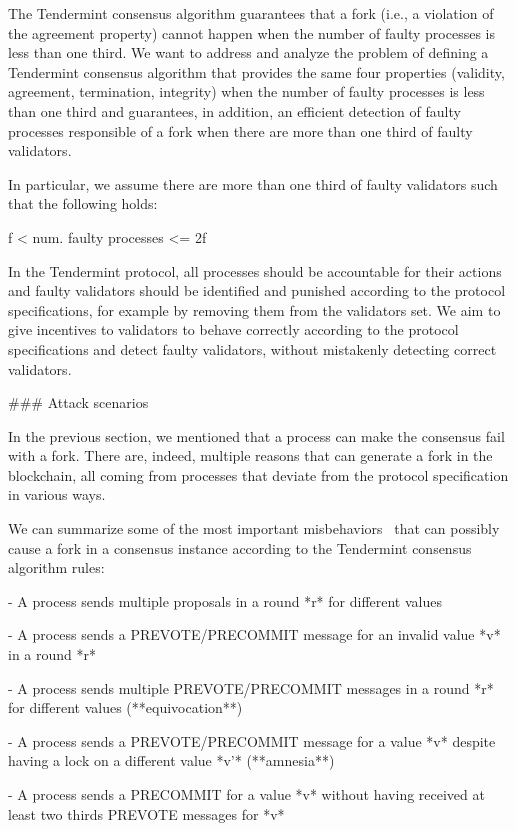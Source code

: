 \documentclass[a4paper,11pt,oneside]{report}
\begin{document}
\begin{markdown}
The Tendermint consensus algorithm guarantees that a fork (i.e., a violation of the agreement property) cannot happen when the number of faulty processes is less than one third.
We want to address and analyze the problem of defining a Tendermint consensus algorithm that provides the same four properties (validity, agreement, termination, integrity) when the number of faulty processes is less than one third and guarantees, in addition, an efficient detection of faulty processes responsible of a fork when there are more than one third of faulty validators.

In particular, we assume there are more than one third of faulty validators such that the following holds:

    f < num. faulty processes <= 2f

In the Tendermint protocol, all processes should be accountable for their actions and faulty validators should be identified and punished according to the protocol specifications, for example by removing them from the validators set.
We aim to give incentives to validators to behave correctly according to the protocol specifications and detect faulty validators, without mistakenly detecting correct validators. 
 
### Attack scenarios
 
In the previous section, we mentioned that a process can make the consensus fail with a fork. There are, indeed, multiple reasons that can generate a fork in the blockchain, all coming from processes that deviate from the protocol specification in various ways.

We can summarize some of the most important misbehaviors~\cite{fork-accountability-overview} that can possibly cause a fork in a consensus instance according to the Tendermint consensus algorithm rules: 

- A process sends multiple proposals in a round *r* for different values 

- A process sends a PREVOTE/PRECOMMIT message for an invalid value *v* in a round *r*

- A process sends multiple PREVOTE/PRECOMMIT messages in a round *r* for different values (**equivocation**)

- A process sends a PREVOTE/PRECOMMIT message for a value *v* despite having a lock on a different value *v'* (**amnesia**)

- A process sends a PRECOMMIT for a value *v* without having received at least two thirds PREVOTE messages for *v* 

\end{markdown}
\end{document}
